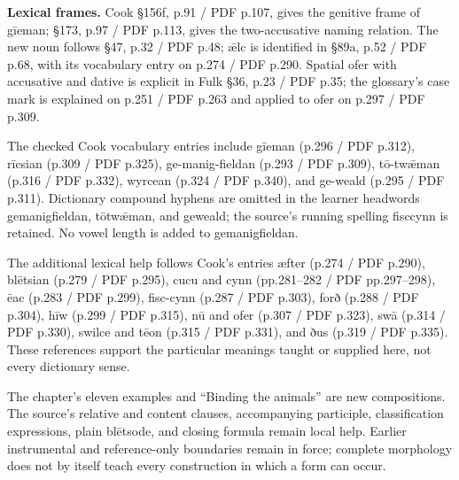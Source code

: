 \textbf{Lexical frames.} Cook §156f, p.91 /\allowbreak{} PDF p.107, gives the genitive frame of gīeman; §173, p.97 /\allowbreak{} PDF p.113, gives the two-accusative naming relation. The new noun follows §47, p.32 /\allowbreak{} PDF p.48; ǣlc is identified in §89a, p.52 /\allowbreak{} PDF p.68, with its vocabulary entry on p.274 /\allowbreak{} PDF p.290. Spatial ofer with accusative and dative is explicit in Fulk §36, p.23 /\allowbreak{} PDF p.35; the glossary’s case mark is explained on p.251 /\allowbreak{} PDF p.263 and applied to ofer on p.297 /\allowbreak{} PDF p.309.

The checked Cook vocabulary entries include gīeman (p.296 /\allowbreak{} PDF p.312), rīcsian (p.309 /\allowbreak{} PDF p.325), ge-manig-fieldan (p.293 /\allowbreak{} PDF p.309), tō-twǣman (p.316 /\allowbreak{} PDF p.332), wyrcean (p.324 /\allowbreak{} PDF p.340), and ge-weald (p.295 /\allowbreak{} PDF p.311). Dictionary compound hyphens are omitted in the learner headwords gemanigfieldan, tōtwǣman, and geweald; the source’s running spelling fisccynn is retained. No vowel length is added to gemanigfieldan.

The additional lexical help follows Cook’s entries æfter (p.274 /\allowbreak{} PDF p.290), blētsian (p.279 /\allowbreak{} PDF p.295), cucu and cynn (pp.281–282 /\allowbreak{} PDF pp.297–298), ēac (p.283 /\allowbreak{} PDF p.299), fisc-cynn (p.287 /\allowbreak{} PDF p.303), forð (p.288 /\allowbreak{} PDF p.304), hīw (p.299 /\allowbreak{} PDF p.315), nū and ofer (p.307 /\allowbreak{} PDF p.323), swā (p.314 /\allowbreak{} PDF p.330), swilce and tēon (p.315 /\allowbreak{} PDF p.331), and ðus (p.319 /\allowbreak{} PDF p.335). These references support the particular meanings taught or supplied here, not every dictionary sense.

The chapter’s eleven examples and “Binding the animals” are new compositions. The source’s relative and content clauses, accompanying participle, classification expressions, plain blētsode, and closing formula remain local help. Earlier instrumental and reference-only boundaries remain in force; complete morphology does not by itself teach every construction in which a form can occur.

\endgroup

